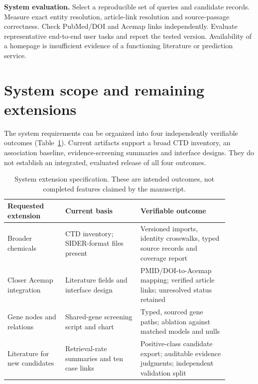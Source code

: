 \textbf{System evaluation.} Select a reproducible set of queries and candidate records. Measure exact entity resolution, article-link resolution and source-passage correctness. Check PubMed/DOI and Acemap links independently. Evaluate representative end-to-end user tasks and report the tested version. Availability of a homepage is insufficient evidence of a functioning literature or prediction service.

\section{System scope and remaining extensions}
The system requirements can be organized into four independently verifiable outcomes (Table~\ref{tab:scope}). Current artifacts support a broad CTD inventory, an association baseline, evidence-screening summaries and interface designs. They do not establish an integrated, evaluated release of all four outcomes.

\begin{table}[htbp]
\centering\small
\caption{System extension specification. These are intended outcomes, not completed features claimed by the manuscript.}
\label{tab:scope}
\begin{tabular}{p{0.23\linewidth}p{0.30\linewidth}p{0.35\linewidth}}
\toprule
Requested extension & Current basis & Verifiable outcome \\
\midrule
Broader chemicals & CTD inventory; SIDER-format files present & Versioned imports, identity crosswalks, typed source records and coverage report \\
Closer Acemap integration & Literature fields and interface design & PMID/DOI-to-Acemap mapping; verified article links; unresolved status retained \\
Gene nodes and relations & Shared-gene screening script and chart & Typed, sourced gene paths; ablation against matched models and nulls \\
Literature for new candidates & Retrieval-rate summaries and ten case links & Positive-class candidate export; auditable evidence judgments; independent validation split \\
\bottomrule
\end{tabular}
\end{table}



